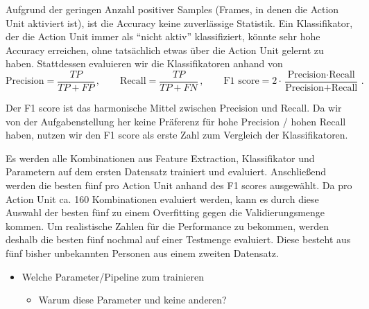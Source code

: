 Aufgrund der geringen Anzahl positiver Samples (Frames, in denen die Action Unit
aktiviert ist), ist die Accuracy keine zuverlässige Statistik. Ein Klassifikator,
der die Action Unit immer als ``nicht aktiv'' klassifiziert, könnte sehr hohe
Accuracy erreichen, ohne tatsächlich etwas über die Action Unit gelernt zu haben.
Stattdessen evaluieren wir die Klassifikatoren anhand von 
\begin{equation*}
\text{Precision}=\frac{TP}{TP+FP}\,, \qquad \text{Recall}=\frac{TP}{TP+FN}\,, \qquad \text{F1 score}=2\cdot\frac{\text{Precision}\cdot\text{Recall}}{\text{Precision}+\text{Recall}}\,.
\end{equation*}

Der F1 score ist das harmonische Mittel zwischen Precision und Recall. Da wir
von der Aufgabenstellung her keine Präferenz für hohe Precision / hohen Recall
haben, nutzen wir den F1 score als erste Zahl zum Vergleich der Klassifikatoren.

Es werden alle Kombinationen aus Feature Extraction, Klassifikator und Parametern
auf dem ersten Datensatz trainiert und evaluiert. Anschließend werden die besten
fünf pro Action Unit anhand des F1 scores ausgewählt. Da pro Action Unit ca. 160
Kombinationen evaluiert werden, kann es durch diese Auswahl der besten fünf zu
einem Overfitting gegen die Validierungsmenge kommen. Um realistische Zahlen für
die Performance zu bekommen, werden deshalb die besten fünf nochmal auf einer
Testmenge evaluiert. Diese besteht aus fünf bisher unbekannten Personen aus
einem zweiten Datensatz.

\begin{itemize}
\item Welche Parameter/Pipeline zum trainieren
  \begin{itemize}
  \item Warum diese Parameter und keine anderen?
  \end{itemize}
\end{itemize}


